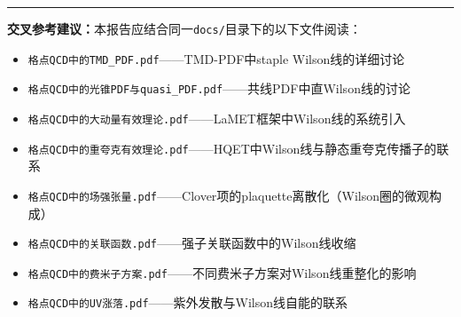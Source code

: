 \documentclass[12pt,a4paper]{ctexart}
\theoremstyle{definition}
\begin{document}
\vspace{0.5cm}
\noindent\rule{\textwidth}{0.5pt}
\small
\textbf{交叉参考建议：}本报告应结合同一\texttt{docs/}目录下的以下文件阅读：
\begin{itemize}[nosep]
    \item \texttt{格点QCD中的TMD\_PDF.pdf}——TMD-PDF中staple Wilson线的详细讨论
    \item \texttt{格点QCD中的光锥PDF与quasi\_PDF.pdf}——共线PDF中直Wilson线的讨论
    \item \texttt{格点QCD中的大动量有效理论.pdf}——LaMET框架中Wilson线的系统引入
    \item \texttt{格点QCD中的重夸克有效理论.pdf}——HQET中Wilson线与静态重夸克传播子的联系
    \item \texttt{格点QCD中的场强张量.pdf}——Clover项的plaquette离散化（Wilson圈的微观构成）
    \item \texttt{格点QCD中的关联函数.pdf}——强子关联函数中的Wilson线收缩
    \item \texttt{格点QCD中的费米子方案.pdf}——不同费米子方案对Wilson线重整化的影响
    \item \texttt{格点QCD中的UV涨落.pdf}——紫外发散与Wilson线自能的联系
\end{itemize}
\end{document}
